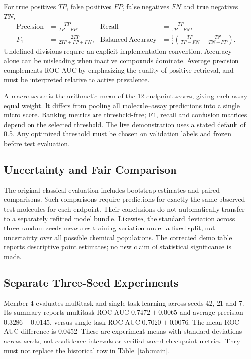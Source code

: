 \documentclass[11pt,a4paper]{article}\usepackage[margin=25mm]{geometry}\usepackage{fancyhdr}\usepackage{setspace}\usepackage{titlesec}\usepackage{xcolor}
\begin{document}
For true positives $TP$, false positives $FP$, false negatives $FN$ and true negatives $TN$,
\begin{align}
\mathrm{Precision}&=\frac{TP}{TP+FP}, &
\mathrm{Recall}&=\frac{TP}{TP+FN},\\
F_1&=\frac{2TP}{2TP+FP+FN}, &
\mathrm{Balanced\ Accuracy}&=\frac{1}{2}\left(\frac{TP}{TP+FN}+\frac{TN}{TN+FP}\right).
\end{align}
Undefined divisions require an explicit implementation convention. Accuracy alone can be misleading when inactive compounds dominate. Average precision complements ROC-AUC by emphasizing the quality of positive retrieval, and must be interpreted relative to active prevalence.

A macro score is the arithmetic mean of the 12 endpoint scores, giving each assay equal weight. It differs from pooling all molecule--assay predictions into a single micro score. Ranking metrics are threshold-free; F1, recall and confusion matrices depend on the selected threshold. The live demonstration uses a stated default of 0.5. Any optimized threshold must be chosen on validation labels and frozen before test evaluation.

\subsection{Uncertainty and Fair Comparison}
The original classical evaluation includes bootstrap estimates and paired comparisons. Such comparisons require predictions for exactly the same observed test molecules for each endpoint. Their conclusions do not automatically transfer to a separately refitted model bundle. Likewise, the standard deviation across three random seeds measures training variation under a fixed split, not uncertainty over all possible chemical populations. The corrected demo table reports descriptive point estimates; no new claim of statistical significance is made.


\subsection{Separate Three-Seed Experiments}
Member 4 evaluates multitask and single-task learning across seeds 42, 21 and 7. Its summary reports multitask ROC-AUC $0.7472\pm0.0065$ and average precision $0.3286\pm0.0145$, versus single-task ROC-AUC $0.7020\pm0.0076$. The mean ROC-AUC difference is 0.0452. These are experiment means with standard deviations across seeds, not confidence intervals or verified saved-checkpoint metrics. They must not replace the historical row in Table~\ref{tab:main}.
\end{document}
